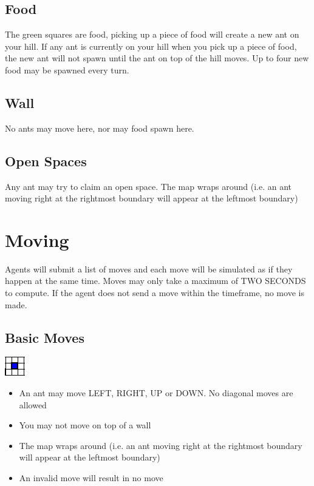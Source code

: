 \documentclass{article}
\begin{document}
\subsection{Food}
The green squares are food, picking up a piece of food will create a new ant on your hill. If any ant is currently on your hill when you pick up a piece of food, the new ant will not spawn until the ant on top of the hill moves. Up to four new food may be spawned every turn.

\subsection{Wall}
No ants may move here, nor may food spawn here.

\subsection{Open Spaces}
Any ant may try to claim an open space. The map wraps around (i.e. an ant moving right at the rightmost boundary will appear at the leftmost boundary)

\newpage
\section{Moving}
Agents will submit a list of moves and each move will be simulated as if they happen at the same time. Moves may only take a maximum of TWO SECONDS to compute. If the agent does not send a move within the timeframe, no move is made.
\subsection{Basic Moves}
\begin{center}
\includegraphics{basicMove.png}
\end{center}
\begin{itemize}
  \item An ant may move LEFT, RIGHT, UP or DOWN. No diagonal moves are allowed
  \item You may not move on top of a wall
  \item The map wraps around (i.e. an ant moving right at the rightmost boundary will appear at the leftmost boundary)
  \item An invalid move will result in no move
\end{itemize}
\end{document}

